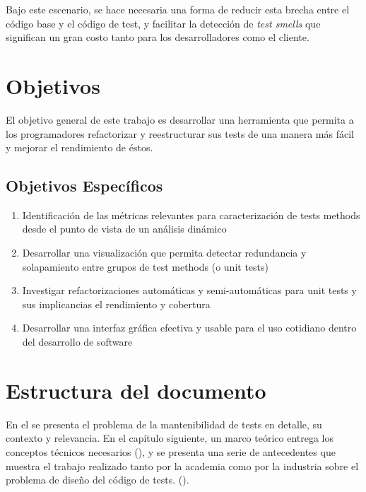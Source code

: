 \par Bajo este escenario, se hace necesaria una forma de reducir esta brecha entre el código base y el código de test, y facilitar la detección de \emph{test smells} que significan un gran costo tanto para los desarrolladores como el cliente.


\newpage
\section{Objetivos}
\par El objetivo general de este trabajo es desarrollar una herramienta que permita a los programadores refactorizar y reestructurar sus tests de una manera más fácil y mejorar el rendimiento de éstos.

\subsection*{Objetivos Específicos}
\begin{enumerate}
\item Identificación de las métricas relevantes para caracterización de tests methods desde el punto de vista de un análisis dinámico
\item Desarrollar una visualización que permita detectar redundancia y solapamiento entre grupos de test methods (o unit tests)
\item Investigar refactorizaciones automáticas y semi-automáticas para unit tests y sus implicancias el rendimiento y cobertura
\item Desarrollar una interfaz gráfica efectiva y usable para el uso cotidiano dentro del desarrollo de software
\end{enumerate}

\section{Estructura del documento}

\par En el  se presenta el problema de la mantenibilidad de tests en detalle, su contexto y relevancia. En el capítulo siguiente, un marco teórico entrega los conceptos técnicos necesarios (), y se presenta una serie de antecedentes que muestra el trabajo realizado tanto por la academia como por la industria sobre el problema de diseño del código de tests. (). 

